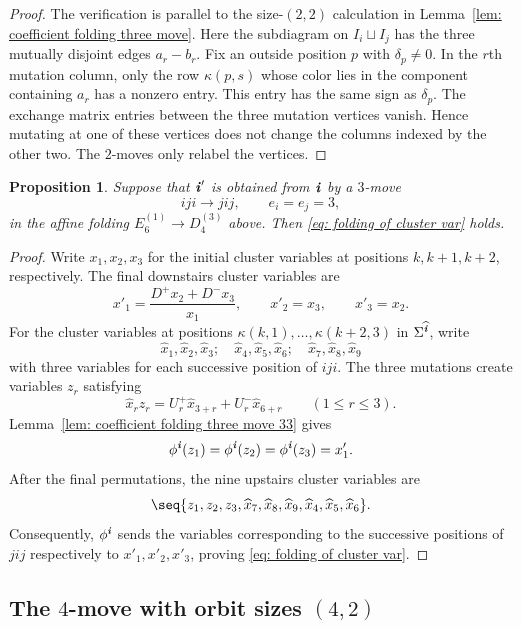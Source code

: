 \documentclass[12pt, leqno]{amsart}
\numberwithin{equation}{section}
\theoremstyle{plain}
\newtheorem{proposition}[lemma]{Proposition}
\theoremstyle{definition}
\renewcommand{\le}{\leqslant}
\newcommand{\ii}{ \textbf{\textit{i}}}
\newcommand{\hx}{\widehat{x}}
\newcommand{\hii}{{\widehat{\ii}}}
\begin{document}
\begin{proof}
The verification is parallel to the size-$(2,2)$ calculation in
Lemma~\ref{lem: coefficient folding three move}.  Here the  subdiagram on $I_i\sqcup I_j${}
has the three mutually disjoint edges $a_r-b_r$.
Fix an outside position $p$ with $\delta_p\ne0$.
In the $r$th mutation column, only the row $\kappa(p,s)$ whose color
lies in the component containing $a_r$ has a nonzero entry.
This entry has the same sign as $\delta_p$.
The exchange matrix entries between the three mutation vertices
vanish. Hence mutating at one of these vertices does not change
the columns indexed by the other two. The $2$-moves only relabel
the vertices.
\end{proof}

\begin{proposition}
\label{prop: cluster variable folding three move 33}
Suppose that $\ii'$ is obtained from $\ii$ by a $3$-move
\[
 iji\longrightarrow jij,\qquad e_i=e_j=3,
\]
in the affine folding $E_6^{(1)}\longrightarrow D_4^{(3)}$ above.
Then \eqref{eq: folding of cluster var} holds.
\end{proposition}

\begin{proof}
  Write $x_1,x_2,x_3$ for the initial cluster variables at positions $k,k+1,k+2$, respectively.    The final downstairs cluster variables are
\[
 x'_1=\frac{D^+x_2+D^-x_3}{x_1},\qquad
 x'_2=x_3,\qquad x'_3=x_2.
\]
  For the cluster variables at positions $\kappa(k,1),\ldots,\kappa(k+2,3)$ in $\Sigma^\hii$, write 
\[
 \hx_1,\hx_2,\hx_3;\quad
 \hx_4,\hx_5,\hx_6;\quad
 \hx_7,\hx_8,\hx_9
\]
 with three variables for each successive position of $iji$.  The three mutations create
variables $z_r$ satisfying
\[
 \hx_rz_r=U_r^+\hx_{3+r}+U_r^-\hx_{6+r}
 \qquad(1\le r\le3).
\]
Lemma~\ref{lem: coefficient folding three move 33} gives
\[
 \phi^\ii(z_1)=\phi^\ii(z_2)=\phi^\ii(z_3)=x'_1.
\]
 After the final permutations, the nine upstairs cluster variables are{}
\[
 \seq{z_1,z_2,z_3,\hx_7,\hx_8,\hx_9,
       \hx_4,\hx_5,\hx_6}.
\]
 Consequently, $\phi^\ii$ sends the variables corresponding to the successive positions of $jij$ respectively to{}
$x'_1,x'_2,x'_3$, proving \eqref{eq: folding of cluster var}.  
\end{proof}

\subsection{\texorpdfstring{  The $4$-move with orbit sizes $(4,2)$}{The 4-move with orbit sizes (4,2)}}
\label{subsec: affine braid 42}
\end{document}

